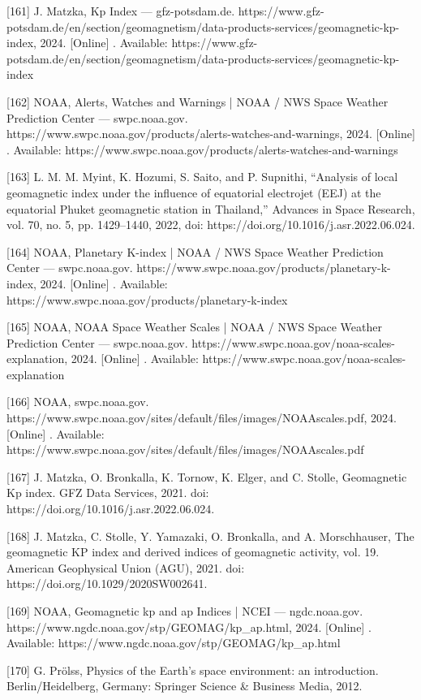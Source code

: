 \documentclass[sn-mathphys-num]{sn-jnl}%
\begin{document}
[161] J. Matzka, Kp Index — gfz-potsdam.de. https://www.gfz-potsdam.de/en/section/geomagnetism/data-products-services/geomagnetic-kp-index, 2024. [Online] . Available: https://www.gfz-potsdam.de/en/section/geomagnetism/data-products-services/geomagnetic-kp-index

[162] NOAA, Alerts, Watches and Warnings | NOAA / NWS Space Weather Prediction Center — swpc.noaa.gov. https://www.swpc.noaa.gov/products/alerts-watches-and-warnings, 2024. [Online] . Available: https://www.swpc.noaa.gov/products/alerts-watches-and-warnings

[163] L. M. M. Myint, K. Hozumi, S. Saito, and P. Supnithi, “Analysis of local geomagnetic index under the influence of equatorial electrojet (EEJ) at the equatorial Phuket geomagnetic station in Thailand,” Advances in Space Research, vol. 70, no. 5, pp. 1429–1440, 2022, doi: https://doi.org/10.1016/j.asr.2022.06.024.

[164] NOAA, Planetary K-index | NOAA / NWS Space Weather Prediction Center — swpc.noaa.gov. https://www.swpc.noaa.gov/products/planetary-k-index, 2024. [Online] . Available: https://www.swpc.noaa.gov/products/planetary-k-index

[165] NOAA, NOAA Space Weather Scales | NOAA / NWS Space Weather Prediction Center — swpc.noaa.gov. https://www.swpc.noaa.gov/noaa-scales-explanation, 2024. [Online] . Available: https://www.swpc.noaa.gov/noaa-scales-explanation

[166] NOAA, swpc.noaa.gov. https://www.swpc.noaa.gov/sites/default/files/images/NOAAscales.pdf, 2024. [Online] . Available: https://www.swpc.noaa.gov/sites/default/files/images/NOAAscales.pdf

[167] J. Matzka, O. Bronkalla, K. Tornow, K. Elger, and C. Stolle, Geomagnetic Kp index. GFZ Data Services, 2021. doi: https://doi.org/10.1016/j.asr.2022.06.024.

[168] J. Matzka, C. Stolle, Y. Yamazaki, O. Bronkalla, and A. Morschhauser, The geomagnetic KP index and derived indices of geomagnetic activity, vol. 19. American Geophysical Union (AGU), 2021. doi: https://doi.org/10.1029/2020SW002641.

[169] NOAA, Geomagnetic kp and ap Indices | NCEI — ngdc.noaa.gov. https://www.ngdc.noaa.gov/stp/GEOMAG/kp_ap.html, 2024. [Online] . Available: https://www.ngdc.noaa.gov/stp/GEOMAG/kp_ap.html

[170] G. Prölss, Physics of the Earth’s space environment: an introduction. Berlin/Heidelberg, Germany: Springer Science & Business Media, 2012.
\end{document}
